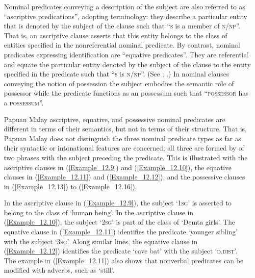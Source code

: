 Nominal predicates conveying a description of the subject are also referred to as “ascriptive predications”, adopting  terminology: they describe a particular entity that is denoted by the subject of the clause such that ``\textsc{s} is a member of \textsc{n}/\textsc{np}''. That is, an ascriptive clause asserts that this entity belongs to the class of entities specified in the nonreferential nominal predicate. By contrast, nominal predicates expressing identification are “equative predicates”. They are referential and equate the particular entity denoted by the subject of the clause to the entity specified in the predicate such that ``\textsc{s} is \textsc{n}/\textsc{np}''. (See \citealt[101]{Hengeveld.1992}; \citealt[105]{Payne.1997}.) In nominal clauses conveying the notion of possession the subject embodies the semantic role of possessor while the predicate functions as an  possessum such that ``\textsc{possessor} has a \textsc{possessum}''.



Papuan Malay ascriptive, equative, and possessive nominal predicates are different in terms of their semantics, but not in terms of their structure. That is, Papuan Malay does not distinguish the three nominal predicate types as far as their syntactic or intonational features are concerned; all three are formed by  of two  phrases with the subject preceding the predicate. This is illustrated with the ascriptive clauses in (\ref{Example_12.9}) and (\ref{Example_12.10}), the equative clauses in (\ref{Example_12.11}) and (\ref{Example_12.12}), and the possessive clauses in (\ref{Example_12.13}) to (\ref{Example_12.16}).



In the ascriptive clause in (\ref{Example_12.9}), the subject  ‘\textsc{1sg}’ is asserted to belong to the class of  ‘human being’. In the ascriptive clause in (\ref{Example_12.10}), the subject  ‘\textsc{2sg}’ is part of the class of  ‘Demta girls’. The equative clause in (\ref{Example_12.11}) identifies the predicate  ‘younger sibling’ with the subject  ‘\textsc{3sg}’. Along similar lines, the equative clause in (\ref{Example_12.12}) identifies the predicate  ‘cave bat’ with the subject  ‘\textsc{d.dist}’. The example in (\ref{Example_12.11}) also shows that nonverbal predicates can be modified with adverbs, such as  ‘still’.


